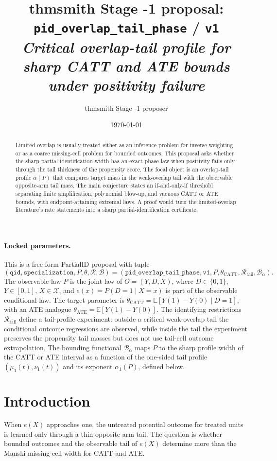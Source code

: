 \documentclass[11pt]{article}
\title{thmsmith Stage -1 proposal: \texttt{pid\_overlap\_tail\_phase} / \texttt{v1}%
  \\ \large\textit{Critical overlap-tail profile for sharp CATT and ATE bounds under positivity failure}}
\author{thmsmith Stage -1 proposer}
\date{\today}
\newcommand{\E}{\mathbb{E}}
\theoremstyle{definition}
\theoremstyle{plain}
\theoremstyle{remark}
\begin{document}
\maketitle


\paragraph{Locked parameters.}
This is a free-form PartialID proposal with tuple
\[
(\texttt{qid},\texttt{specialization},P,\theta,\mathcal R,\mathcal B)
=
(\texttt{pid\_overlap\_tail\_phase},\texttt{v1},P,\theta_{\mathrm{CATT}},\mathcal R_{\mathrm{tail}},\mathcal B_{\alpha}).
\]
The observable law \(P\) is the joint law of \(O=(Y,D,X)\), where \(D\in\{0,1\}\), \(Y\in[0,1]\), \(X\in\mathcal X\), and \(e(x)=P(D=1\mid X=x)\) is part of the observable conditional law.  The target parameter is \(\theta_{\mathrm{CATT}}=\E[Y(1)-Y(0)\mid D=1]\), with an ATE analogue \(\theta_{\mathrm{ATE}}=\E[Y(1)-Y(0)]\).  The identifying restrictions \(\mathcal R_{\mathrm{tail}}\) define a tail-profile experiment: outside a critical weak-overlap tail the conditional outcome regressions are observed, while inside the tail the experiment preserves the propensity tail masses but does not use tail-cell outcome extrapolation.  The bounding functional \(\mathcal B_{\alpha}\) maps \(P\) to the sharp profile width of the CATT or ATE interval as a function of the one-sided tail profile \((\mu_1(t),\nu_1(t))\) and its exponent \(\alpha_1(P)\), defined below.

\begin{abstract}
Limited overlap is usually treated either as an inference problem for inverse weighting or as a coarse missing-cell problem for bounded outcomes.  This proposal asks whether the sharp partial-identification width has an exact phase law when positivity fails only through the tail thickness of the propensity score.  The focal object is an overlap-tail profile \(\alpha(P)\) that compares target mass in the weak-overlap tail with the observable opposite-arm tail mass.  The main conjecture states an if-and-only-if threshold separating finite amplification, polynomial blow-up, and vacuous CATT or ATE bounds, with endpoint-attaining extremal laws.  A proof would turn the limited-overlap literature's rate statements into a sharp partial-identification certificate.
\end{abstract}

\section{Introduction}
When \(e(X)\) approaches one, the untreated potential outcome for treated units is learned only through a thin opposite-arm tail.  The question is whether bounded outcomes and the observable tail of \(e(X)\) determine more than the Manski missing-cell width for CATT and ATE.
\end{document}
